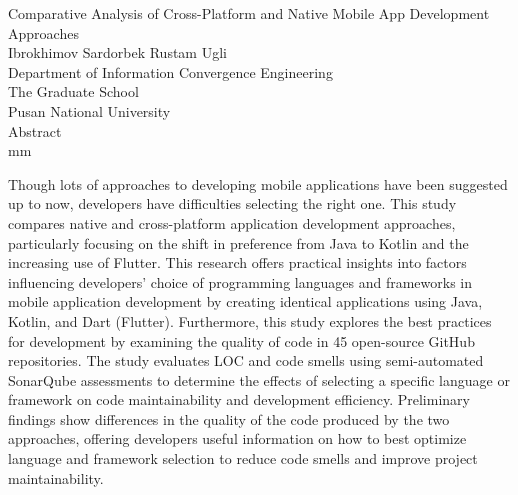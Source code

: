 \thispagestyle{empty}
\begin{center}
    \vskip 3.5cm
    {\Large{Comparative Analysis of Cross-Platform and Native Mobile App Development Approaches}} \\
    \vskip 15mm
    {\large{Ibrokhimov Sardorbek Rustam Ugli}} \\
    \vskip 10mm
    {Department of Information Convergence Engineering} \\
    {The Graduate School} \\
    {Pusan National University} \\
    \vskip 15mm
    {\large{Abstract}}\\
     mm
\end{center}
Though lots of approaches to developing mobile applications have been suggested up to now, developers have difficulties selecting the right one. This study compares native and cross-platform application development approaches, particularly focusing on the shift in preference from Java to Kotlin and the increasing use of Flutter. This research offers practical insights into factors influencing developers’ choice of programming languages and frameworks in mobile application development by creating identical applications using Java, Kotlin, and Dart (Flutter). Furthermore, this study explores the best practices for development by examining the quality of code in 45 open-source GitHub repositories. The study evaluates LOC and code smells using semi-automated SonarQube assessments to determine the effects of selecting a specific language or framework on code maintainability and development efficiency. Preliminary findings show differences in the quality of the code produced by the two approaches, offering developers useful information on how to best optimize language and framework selection to reduce code smells and improve project maintainability.    
